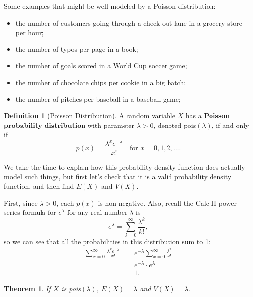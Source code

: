 \documentclass[
]{book}
\providecommand{\tightlist}{%
  \setlength{\itemsep}{0pt}\setlength{\parskip}{0pt}}
\newtheorem{theorem}{Theorem}[chapter]
\theoremstyle{definition}
\newtheorem{definition}{Definition}[chapter]
\theoremstyle{definition}
\theoremstyle{definition}
\theoremstyle{definition}
\theoremstyle{remark}
\begin{document}
Some examples that might be well-modeled by a Poisson distribution:

\begin{itemize}
\tightlist
\item
  the number of customers going through a check-out lane in a grocery store per hour;
\item
  the number of typos per page in a book;
\item
  the number of goals scored in a World Cup soccer game;
\item
  the number of chocolate chips per cookie in a big batch;
\item
  the number of pitches per baseball in a baseball game;
\end{itemize}

\begin{definition}[Poisson Distribution]
\protect\hypertarget{def:poisson-distribution}{}\label{def:poisson-distribution}A random variable \(X\) has a \textbf{Poisson probability distribution} with parameter \(\lambda > 0\), denoted \(\text{pois}(\lambda)\), if and only if \[p(x) = \frac{\lambda^x e^{-\lambda}}{x!} ~~~\text{ for } x = 0,1,2, \ldots.\]
\end{definition}

We take the time to explain how this probability density function does actually model such things, but first let's check that it is a valid probability density function, and then find \(E(X)\) and \(V(X)\).

First, since \(\lambda > 0\), each \(p(x)\) is non-negative. Also, recall the Calc II power series formula for \(e^\lambda\) for any real number \(\lambda\) is \[e^\lambda = \sum_{k=0}^\infty \frac{\lambda^k}{k!},\] so we can see that all the probabilities in this distribution sum to 1:
\begin{align*}
\sum_{x=0}^\infty \frac{\lambda^x e^{-\lambda}}{x!} &= e^{-\lambda} \sum_{x=0}^\infty \frac{\lambda^x}{x!} \\
&= e^{-\lambda}\cdot e^{\lambda} \\
&= 1.
\end{align*}

\begin{theorem}
\protect\hypertarget{thm:poisson-EandV}{}\label{thm:poisson-EandV}If \(X\) is pois\((\lambda)\), \(E(X) = \lambda\) and \(V(X) = \lambda\).
\end{theorem}
\end{document}

